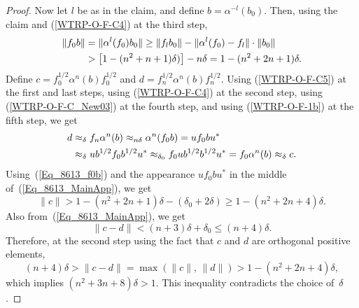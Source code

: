 \documentclass[11pt]{amsart}
\theoremstyle{plain}
\theoremstyle{definition}
\theoremstyle{remark}
\numberwithin{equation}{section}
\newcommand{\af}{\alpha}
\newcommand{\dt}{\delta}
\begin{document}
\begin{proof}
Now let $l$ be as in the claim,
and define $b = \af^{- l} (b_0)$.
Then, using the claim and (\ref{WTRP-O-F-C4}) at the third step,
%
\begin{align}\label{Eq_8613_f0b}
\| f_0 b \|
& = \| \af^l (f_0) b_0 \|
  \geq \| f_l b_0 \| - \| \af^l (f_0) - f_l \|\cdot \| b_0 \|
\\
& > \bigl[ 1 - (n^2 + n + 1) \dt) \bigr] - n \dt
  = 1 - (n^2 + 2 n + 1) \dt.
\notag
\end{align}
%
Define $c = f_0^{1/2} \af^n (b) f_0^{1/2}$
and $d = f_n^{1/2} \af^n (b) f_n^{1/2}$.
Using (\ref{WTRP-O-F-C5}) at the first and last steps,
using (\ref{WTRP-O-F-C4}) at the second step,
using (\ref{WTRP-O-F-C_New03}) at the fourth step,
and using (\ref{WTRP-O-F-1b}) at the fifth step,
we get
%
\begin{align}\label{Eq_8613_MainApp}
d
& \approx_{\dt} f_n \af^n (b)
  \approx_{n \dt} \af^n (f_0 b)
  = u f_0 b u^*
\\
& \approx_{\dt} u b^{1/2} f_0 b^{1/2} u^*
  \approx_{\dt_0} f_0 u b^{1/2} b^{1/2} u^*
  = f_0 \af^n (b)
  \approx_{\dt} c.
\notag
\end{align}
%
Using~(\ref{Eq_8613_f0b})
and the appearance $u f_0 b u^*$
in the middle of~(\ref{Eq_8613_MainApp}),
we get
\[
\| c \|
   > 1 - (n^2 + 2 n + 1) \dt - (\dt_0 + 2 \dt)
   \geq 1 - (n^2 + 2 n + 4) \dt.
\]
Also from~(\ref{Eq_8613_MainApp}),
we get
\[
\| c - d \|
   < (n + 3) \dt + \dt_0
   \leq (n + 4) \dt.
\]
Therefore,
at the second step using the fact that
$c$ and $d$ are orthogonal positive elements,
\[
(n + 4) \dt
 > \| c - d \|
 = \max (\| c \|, \, \| d \|)
 > 1 - (n^2 + 2 n + 4) \dt,
\]
which implies
$(n^2 + 3 n + 8) \dt > 1$.
This inequality contradicts the choice of~$\dt$.
\end{proof}
\end{document}
